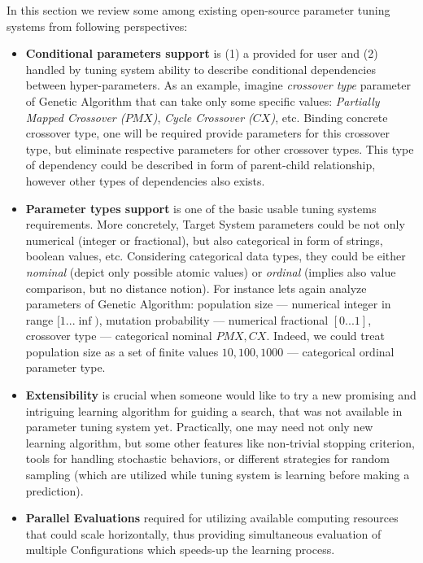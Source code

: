 In this section we review some among existing open-source parameter tuning systems from following perspectives:
\begin{itemize}[itemsep=8pt]
	\item \textbf{Conditional parameters support} is (1) a provided for user and (2) handled by tuning system ability to describe conditional dependencies between hyper-parameters. As an example, imagine \textit{crossover type} parameter of Genetic Algorithm that can take only some specific values: \textit{Partially Mapped Crossover ($PMX$)}, \textit{Cycle Crossover ($CX$)}, etc. Binding concrete crossover type, one will be required provide parameters for this crossover type, but eliminate respective parameters for other crossover types. This type of dependency could be described in form of parent-child relationship, however other types of dependencies also exists.
	
	\item \textbf{Parameter types support} is one of the basic usable tuning systems requirements. More concretely, Target System parameters could be not only numerical (integer or fractional), but also categorical in form of strings, boolean values, etc. Considering categorical data types, they could be either \textit{nominal} (depict only possible atomic values) or \textit{ordinal} (implies also value comparison, but no distance notion). For instance lets again analyze parameters of Genetic Algorithm: population size — numerical integer in range $[1...\inf)$, mutation probability — numerical fractional $[0...1]$, crossover type — categorical nominal ${PMX, CX}$. Indeed, we could treat population size as a set of finite values ${10, 100, 1000}$ — categorical ordinal parameter type.
	
	\item \textbf{Extensibility} is crucial when someone would like to try a new promising and intriguing learning algorithm for guiding a search, that was not available in parameter tuning system yet. Practically, one may need not only new learning algorithm, but some other features like non-trivial stopping criterion, tools for handling stochastic behaviors, or different strategies for random sampling (which are utilized while tuning system is learning before making a prediction).
	
	\item \textbf{Parallel Evaluations} required for utilizing available computing resources that could scale horizontally, thus providing simultaneous evaluation of multiple Configurations which speeds-up the learning process.
\end{itemize}

